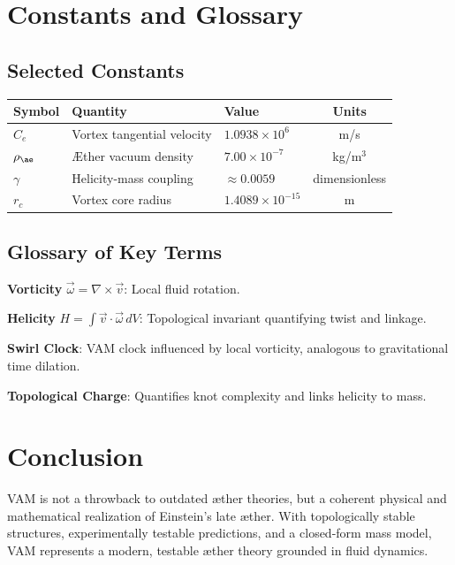 \documentclass[12pt]{article}
\begin{document}
    \section{Constants and Glossary}
    \subsection{Selected Constants}
    \begin{tabular}{lllc}
        \toprule
        Symbol & Quantity & Value & Units \\
        \midrule
        $C_e$ & Vortex tangential velocity & $1.0938 \times 10^6$ & m/s \\
        $\rho_{\ae}$ & Æther vacuum density & $7.00 \times 10^{-7}$ & kg/m$^3$ \\
        $\gamma$ & Helicity-mass coupling & $\approx 0.0059$ & dimensionless \\
        $r_c$ & Vortex core radius & $1.4089 \times 10^{-15}$ & m \\
        \bottomrule
    \end{tabular}

    \subsection{Glossary of Key Terms}
    \textbf{Vorticity} \(\vec{\omega} = \nabla \times \vec{v}\): Local fluid rotation.

    \textbf{Helicity} \(H = \int \vec{v} \cdot \vec{\omega} \, dV\): Topological invariant quantifying twist and linkage.

    \textbf{Swirl Clock}: VAM clock influenced by local vorticity, analogous to gravitational time dilation.

    \textbf{Topological Charge}: Quantifies knot complexity and links helicity to mass.

    \section{Conclusion}
    VAM is not a throwback to outdated æther theories, but a coherent physical and mathematical realization of Einstein’s late æther. With topologically stable structures, experimentally testable predictions, and a closed-form mass model, VAM represents a modern, testable æther theory grounded in fluid dynamics.
\end{document}
